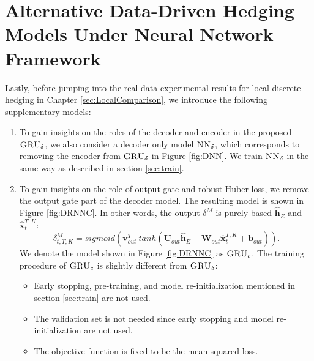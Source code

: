 \documentclass[letterpaper,12pt,titlepage,oneside,final]{book}
\numberwithin{equation}{section}
\theoremstyle{definition}
\newcommand{\model}{\textsc{GRU}_\delta}
\newcommand{\modelN}{\textsc{NN}_\delta}
\newcommand{\vb}{\mathbf{b}}
\newcommand{\vx}{\mathbf{x}}
\newcommand{\vv}{\mathbf{v}}
\newcommand{\vW}{\pmb{W}}
\newcommand{\vU}{\pmb{U}}
\begin{document}
\section{Alternative Data-Driven Hedging Models Under Neural Network Framework}
\label{sec:alternativeModel}
Lastly, before jumping into the real data experimental results for local discrete hedging in Chapter \ref{sec:LocalComparison}, we introduce the following supplementary models:
\begin{enumerate}
	\item To gain insights on the roles of the decoder and encoder in the proposed $\model$,  we  also consider a decoder only model $\modelN$, which corresponds to removing the encoder from $\model$ in Figure \ref{fig:DNN}.  We train  $\modelN$ in the same way  as described in section \ref{sec:train}. 
	\item To gain insights on the role of output gate and robust Huber loss, we remove the output gate part of the decoder model. The resulting model  is shown in Figure \ref{fig:DRNNC}. In other words, the output $\delta^M$ is purely based $\mathbf{\widehat{h}}_E$ and $ \widehat{\vx}_{t}^{T,K}$:
	\[
		{\delta}^M_{t,T,K}=sigmoid (\vv^T_{out} \ tanh( \vU_{out} \mathbf{\widehat{h}}_E + \vW_{out} \widehat{\vx}_{t}^{T,K}+ \vb_{out})).
	\]
	We denote the model shown in Figure \ref{fig:DRNNC} as $\textsc{GRU}_{c}$. The training procedure of $\textsc{GRU}_{c}$ is slightly different from $\model$:
	\begin{itemize}
		\item Early stopping, pre-training, and model re-initialization mentioned in section \ref{sec:train} are not used.
		\item The validation set is not needed since early stopping and model re-initialization are not used.
		\item The objective function is fixed to be the mean squared loss.
	\end{itemize}
\end{enumerate}
\end{document}
